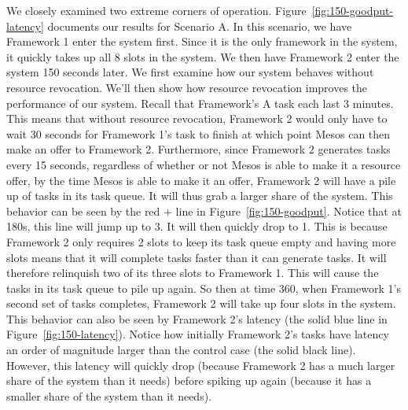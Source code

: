 We closely examined two extreme corners of operation. Figure~\ref{fig:150-goodput-latency} documents our
results for Scenario A. In this scenario, we have Framework 1 enter the system first. Since it is the 
only framework in the system, it quickly takes up all 8 slots in the system. We then have Framework 2
enter the system 150 seconds later. We first examine how our system behaves without resource revocation.
We'll then show how resource revocation improves the performance of our system. Recall that Framework's
A task each last 3 minutes. This means that without resource revocation, Framework 2 would only have to
wait 30 seconds for Framework 1's task to finish at which point Mesos can then make an offer to 
Framework 2. Furthermore, since Framework 2 generates tasks every 15 seconds, regardless of whether or
not Mesos is able to make it a resource offer, by the time Mesos is able to make it an offer, 
Framework 2 will have a pile up of tasks in its task queue. It will thus grab a larger share of the 
system. This behavior can be seen by the red $+$ line in Figure~\ref{fig:150-goodput}. Notice that at 
180s, this line will jump up to 3. It will then quickly drop to 1. This is because Framework 2 only 
requires 2 slots to keep its task queue empty and having more slots means that it will complete tasks 
faster than it can generate tasks. It will therefore relinquish two of its three slots to Framework 1.
This will cause the tasks in its task queue to pile up again. So then at time 360, when Framework 1's
second set of tasks completes, Framework 2 will take up four slots in the system. This behavior can
also be seen by Framework 2's latency (the solid blue line in Figure~\ref{fig:150-latency}). Notice how
initially Framework 2's tasks have latency an order of magnitude larger than the control case (the
solid black line). However, this latency will quickly drop (because Framework 2 has a much larger share
of the system than it needs) before spiking up again (because it has a smaller share of the system
than it needs).

